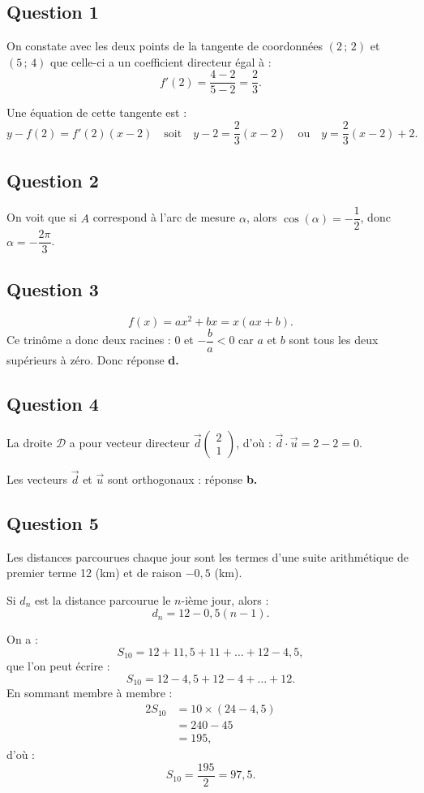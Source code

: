 \subsection*{Question 1}

On constate avec les deux points de la tangente de coordonnées \( (2\,;\,2) \) et \( (5\,;\,4) \) que celle-ci a un coefficient directeur égal à :
\[
f'(2) = \dfrac{4 - 2}{5 - 2} = \dfrac{2}{3}.
\]

Une équation de cette tangente est :
\[
y - f(2) = f'(2)(x - 2) \quad \text{soit} \quad y - 2 = \dfrac{2}{3}(x - 2) \quad \text{ou} \quad y = \dfrac{2}{3}(x - 2) + 2.
\]

\subsection*{Question 2}

On voit que si \( A \) correspond à l'arc de mesure \( \alpha \), alors \( \cos(\alpha) = -\dfrac{1}{2} \), donc \( \alpha = -\dfrac{2\pi}{3} \).

\subsection*{Question 3}

\[
f(x) = ax^2 + bx = x(ax + b).
\]
Ce trinôme a donc deux racines : 0 et \( -\dfrac{b}{a} < 0 \) car \( a \) et \( b \) sont tous les deux supérieurs à zéro. Donc réponse \textbf{d.}

\subsection*{Question 4}

La droite \( \mathcal{D} \) a pour vecteur directeur \( \vec{d} \begin{pmatrix} 2 \\ 1 \end{pmatrix} \), d'où : \(\vec{d} \cdot \vec{u} = 2 - 2 = 0\).

Les vecteurs \( \vec{d} \) et \( \vec{u} \) sont orthogonaux : réponse \textbf{b.}

\subsection*{Question 5}

Les distances parcourues chaque jour sont les termes d'une suite arithmétique de premier terme 12 (km) et de raison \(-0,5\) (km).

Si \( d_n \) est la distance parcourue le \( n \)-ième jour, alors :
\[
d_n = 12 - 0,5(n - 1).
\]

On a :
\[
S_{10} = 12 + 11{,}5 + 11 + \dots + 12 - 4{,}5,
\]
que l'on peut écrire :
\[
S_{10} = 12 - 4{,}5 + 12 - 4 + \dots + 12.
\]
En sommant membre à membre :
\begin{align*}
2S_{10} &= 10 \times (24 - 4{,}5) \\
&= 240 - 45 \\
&= 195,
\end{align*}
d'où :
\[
S_{10} = \dfrac{195}{2} = 97{,}5.
\]
